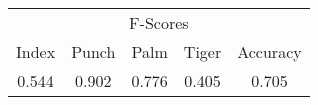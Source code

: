 \documentclass{standalone}
\begin{document}
 
 \begin{tabular}{|c|c|c|c ||c|}
\cline{1-5}\multicolumn{5}{|c|}{F-Scores} \\ 
\cline{1-5}Index & Punch & Palm & Tiger & Accuracy\\ 
\cline{1-5}0.544 & 0.902 & 0.776 & 0.405 & 0.705\\ 
 \cline{1-5}\hline \end{tabular}
 
\end{document}
